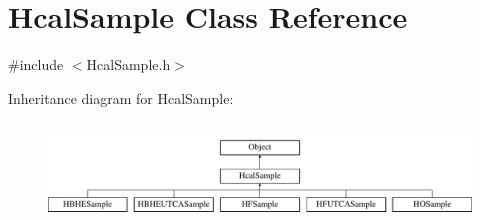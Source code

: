 \hypertarget{class_hcal_sample}{}\section{Hcal\+Sample Class Reference}
\label{class_hcal_sample}


{\ttfamily \#include $<$Hcal\+Sample.\+h$>$}

Inheritance diagram for Hcal\+Sample\+:\begin{figure}[H]
\begin{center}
\leavevmode
\includegraphics[height=2.625000cm]{class_hcal_sample}
\end{center}
\end{figure}

